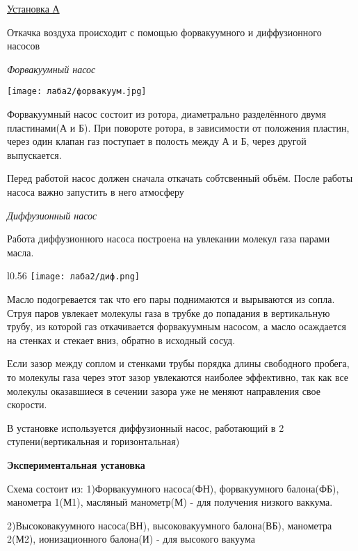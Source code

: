 \documentclass[a4paper]{article}
\begin{document}
\underline{Установка А}

Откачка воздуха происходит с помощью форвакуумного и диффузионного насосов
\vspace{5pt}

\textit{Форвакуумный насос}

    \begin{center}\texttt{[image: лаба2/форвакуум.jpg]}
    \end{center}

Форвакуумный насос состоит из ротора, диаметрально разделённого двумя пластинами(А и Б).
При повороте ротора, в зависимости от положения пластин, через один клапан газ поступает в полость между А и Б, 
через другой выпускается. 

Перед работой насос должен сначала откачать собтсвенный объём. После работы насоса важно запустить в него атмосферу

\vspace{5pt}
\textit{Диффузионный насос}

Работа диффузионного насоса построена на увлекании молекул газа парами масла.

\begin{wrapfigure}{l}{0.56\textwidth}
    \centering
    \texttt{[image: лаба2/диф.png]}

\end{wrapfigure}

\vspace{10pt}
Масло подогревается так что его пары поднимаются и вырываются из сопла. Струя паров
увлекает молекулы газа в трубке до попадания в вертикальную трубу, из которой газ откачивается форвакуумным насосом, а 
масло осаждается на стенках и стекает вниз, обратно в исходный сосуд.

Если зазор между соплом и стенками трубы порядка длины свободного пробега, то молекулы газа через этот зазор увлекаются 
наиболее эффективно, так как все молекулы оказавшиеся в сечении зазора уже не меняют направления свое скорости.

В установке используется диффузионный насос, работающий в 2 ступени(вертикальная и горизонтальная) 

\pagebreak


\textbf{Экспериментальная установка}

Схема состоит из: 1)Форвакуумного насоса(ФН), форвакуумного балона(ФБ), манометра 1(М1), масляный манометр(М) - для получения низкого ваккума.
\par
2)Высоковакуумного насоса(ВН), высоковакуумного балона(ВБ), манометра 2(М2), ионизационного балона(И) - для высокого вакуума
\end{document}
